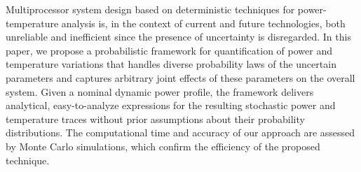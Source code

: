 Multiprocessor system design based on deterministic techniques for power-temperature analysis is, in the context of current and future technologies, both unreliable and inefficient since the presence of uncertainty is disregarded. In this paper, we propose a probabilistic framework for quantification of power and temperature variations that handles diverse probability laws of the uncertain parameters and captures arbitrary joint effects of these parameters on the overall system. Given a nominal dynamic power profile, the framework delivers analytical, easy-to-analyze expressions for the resulting stochastic power and temperature traces without prior assumptions about their probability distributions. The computational time and accuracy of our approach are assessed by Monte Carlo simulations, which confirm the efficiency of the proposed technique.
